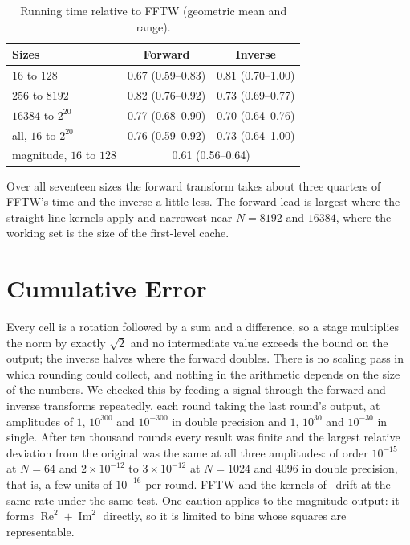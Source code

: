 \documentclass[conference]{IEEEtran}
\newcommand{\re}{\operatorname{Re}}
\newcommand{\im}{\operatorname{Im}}
\begin{document}
\begin{table}[b]
\caption{Running time relative to FFTW (geometric mean and range).}
\label{tab:fftw}
\centering
\begin{tabular}{@{}lcc@{}}
\toprule
Sizes & Forward & Inverse\\
\midrule
$16$ to $128$ & 0.67 (0.59--0.83) & 0.81 (0.70--1.00)\\
$256$ to $8192$ & 0.82 (0.76--0.92) & 0.73 (0.69--0.77)\\
$16384$ to $2^{20}$ & 0.77 (0.68--0.90) & 0.70 (0.64--0.76)\\
all, $16$ to $2^{20}$ & 0.76 (0.59--0.92) & 0.73 (0.64--1.00)\\
\midrule
magnitude, $16$ to $128$ & \multicolumn{2}{c}{0.61 (0.56--0.64)}\\
\bottomrule
\end{tabular}
\end{table}

Over all seventeen sizes the forward transform takes about three quarters of FFTW's time and the inverse a little less.
The forward lead is largest where the straight-line kernels apply and narrowest near $N=8192$ and $16384$, where the working set is the size of the first-level cache.

\section{Cumulative Error}

Every cell is a rotation followed by a sum and a difference, so a stage multiplies the norm by exactly $\sqrt2$ and no intermediate value exceeds the bound on the output; the inverse halves where the forward doubles.
There is no scaling pass in which rounding could collect, and nothing in the arithmetic depends on the size of the numbers.
We checked this by feeding a signal through the forward and inverse transforms repeatedly, each round taking the last round's output, at amplitudes of $1$, $10^{300}$ and $10^{-300}$ in double precision and $1$, $10^{30}$ and $10^{-30}$ in single.
After ten thousand rounds every result was finite and the largest relative deviation from the original was the same at all three amplitudes: of order $10^{-15}$ at $N=64$ and $2\times10^{-12}$ to $3\times10^{-12}$ at $N=1024$ and $4096$ in double precision, that is, a few units of $10^{-16}$ per round.
FFTW and the kernels of~\cite{obr} drift at the same rate under the same test.
One caution applies to the magnitude output: it forms $\re^2+\im^2$ directly, so it is limited to bins whose squares are representable.
\end{document}
